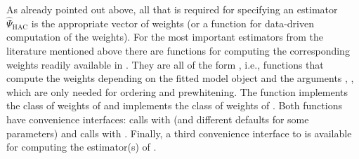 \documentclass{Z}
\begin{document}
As already pointed out above, all that is required for specifying an estimator
$\hat \Psi_{\mathrm{HAC}}$ is the appropriate vector of weights (or a function
for data-driven computation of the weights). 
For the most important estimators from the literature mentioned above there are
functions for computing the corresponding weights readily available in .
They are all of the form ,
i.e., functions that compute the weights depending on the fitted model object 
and the arguments , ,  which are only needed
for ordering and prewhitening. The function  implements the class
of weights of \cite{hac:Andrews:1991} and  implements the class of
weights of \cite{hac:Lumley+Heagerty:1999}. Both functions have convenience interfaces:
 calls  with  (and different defaults
for some parameters) and  calls  with .
Finally, a third convenience interface
to  is available for computing the estimator(s) of
\cite{hac:Newey+West:1987,hac:Newey+West:1994}.
\end{document}
